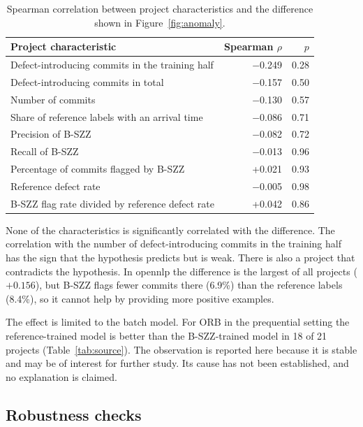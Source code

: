 \documentclass[12pt,a4paper,oneside]{report}
\begin{document}
\begin{table}[htbp]
\centering\small
\caption{Spearman correlation between project characteristics and the
difference shown in Figure~\ref{fig:anomaly}.}
\label{tab:anomaly}
\begin{tabular}{@{}lrr@{}}
\toprule
Project characteristic & Spearman $\rho$ & $p$ \\
\midrule
Defect-introducing commits in the training half & $-$0.249 & 0.28 \\
Defect-introducing commits in total & $-$0.157 & 0.50 \\
Number of commits & $-$0.130 & 0.57 \\
Share of reference labels with an arrival time & $-$0.086 & 0.71 \\
Precision of B-SZZ & $-$0.082 & 0.72 \\
Recall of B-SZZ & $-$0.013 & 0.96 \\
Percentage of commits flagged by B-SZZ & +0.021 & 0.93 \\
Reference defect rate & $-$0.005 & 0.98 \\
B-SZZ flag rate divided by reference defect rate & +0.042 & 0.86 \\
\bottomrule
\end{tabular}
\end{table}

None of the characteristics is significantly correlated with the difference.
The correlation with the number of defect-introducing commits in the training
half has the sign that the hypothesis predicts but is weak. There is also a
project that contradicts the hypothesis. In opennlp the difference is the
largest of all projects ($+0.156$), but B-SZZ flags fewer commits there
(6.9\%) than the reference labels (8.4\%), so it cannot help by providing
more positive examples.

The effect is limited to the batch model. For ORB in the prequential setting
the reference-trained model is better than the B-SZZ-trained model in 18 of
21 projects (Table~\ref{tab:source}). The observation is reported here
because it is stable and may be of interest for further study. Its cause has
not been established, and no explanation is claimed.

\subsection{Robustness checks}\label{sec:robustness}
\end{document}
